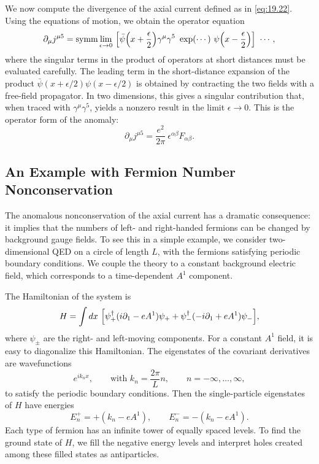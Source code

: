 We now compute the divergence of the axial current defined as in
\eqref{eq:19.22}.  Using the equations of motion, we obtain the operator
equation
\begin{equation}
  \partial_\mu j^{\mu 5} = \mathrm{symm}\lim_{\epsilon\to 0}\ \Bigl[
    \bar{\psi}\Bigl( x + \frac{\epsilon}{2} \Bigr)\gamma^\mu\gamma^5\
    \exp(\cdots)\ \psi\Bigl( x - \frac{\epsilon}{2} \Bigr) \Bigr]\
    \cdots ,
  \label{eq:19.25}
\end{equation}
where the singular terms in the product of operators at short distances must
be evaluated carefully.  The leading term in the short-distance expansion of
the product $\bar{\psi}(x+\epsilon/2)\psi(x-\epsilon/2)$ is obtained by
contracting the two fields with a free-field propagator.  In two dimensions,
this gives a singular contribution that, when traced with
$\gamma^\mu\gamma^5$, yields a nonzero result in the limit $\epsilon\to 0$.
This is the operator form of the anomaly:
\begin{equation}
  \partial_\mu j^{\mu 5} = \frac{e^2}{2\pi}\ \epsilon^{\alpha\beta}F_{\alpha\beta}
  .
  \label{eq:19.29}
\end{equation}

\subsection{An Example with Fermion Number Nonconservation}

The anomalous nonconservation of the axial current has a dramatic
consequence: it implies that the numbers of left- and right-handed fermions
can be changed by background gauge fields.  To see this in a simple example,
we consider two-dimensional QED on a circle of length $L$, with the fermions
satisfying periodic boundary conditions.  We couple the theory to a constant
background electric field, which corresponds to a time-dependent $A^1$
component.

The Hamiltonian of the system is
\begin{equation}
  H = \int dx\ \Bigl[ \psi^{\dagger}_+(i\partial_1 - eA^1)\psi_+
    + \psi^{\dagger}_-(-i\partial_1 + eA^1)\psi_- \Bigr] ,
  \label{eq:19.34}
\end{equation}
where $\psi_{\pm}$ are the right- and left-moving components.  For a constant
$A^1$ field, it is easy to diagonalize this Hamiltonian.  The eigenstates of
the covariant derivatives are wavefunctions
\begin{equation}
  e^{ik_n x},\qquad \text{with } k_n = \frac{2\pi}{L}n,\qquad n = -\infty,
    \ldots, \infty ,
  \label{eq:19.35}
\end{equation}
to satisfy the periodic boundary conditions.  Then the single-particle
eigenstates of $H$ have energies
\begin{equation}
  E^+_n = +(k_n - eA^1),\qquad E^-_n = -(k_n - eA^1) .
  \label{eq:19.36}
\end{equation}
Each type of fermion has an infinite tower of equally spaced levels.  To find
the ground state of $H$, we fill the negative energy levels and interpret
holes created among these filled states as antiparticles.

